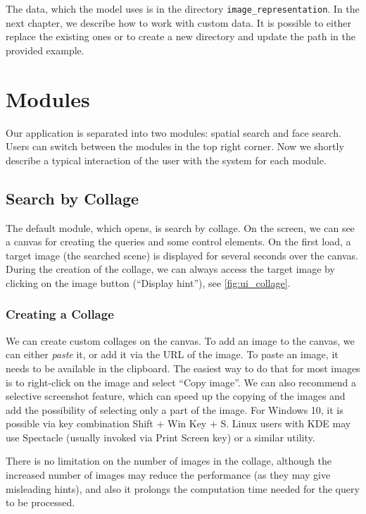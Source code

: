 The data, which the model uses is in the directory \verb+image_representation+. In the next chapter, we describe how to work with custom data. It is possible to either replace the existing ones or to create a new directory and update the path in the provided example.

\section{Modules}

Our application is separated into two modules: spatial search and face search. Users can switch between the modules in the top right corner. Now we shortly describe a typical interaction of the user with the system for each module.

\subsection{Search by Collage}

The default module, which opens, is search by collage. On the screen, we can see a canvas for creating the queries and some control elements. On the first load, a target image (the searched scene) is displayed for several seconds over the canvas. During the creation of the collage, we can always access the target image by clicking on the image button (``Display hint''), see \autoref{fig:ui_collage}.

\subsubsection*{Creating a Collage}

We can create custom collages on the canvas. To add an image to the canvas, we can either \emph{paste} it, or add it via the URL of the image. To paste an image, it needs to be available in the clipboard. The easiest way to do that for most images is to right-click on the image and select ``Copy image''. We can also recommend a selective screenshot feature, which can speed up the copying of the images and add the possibility of selecting only a part of the image. For Windows 10, it is possible via key combination Shift + Win Key + S. Linux users with KDE may use Spectacle (usually invoked via Print Screen key) or a similar utility.

There is no limitation on the number of images in the collage, although the increased number of images may reduce the performance (as they may give misleading hints), and also it prolongs the computation time needed for the query to be processed.

